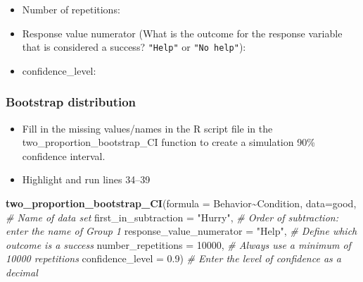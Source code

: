 \documentclass[
]{report}
\newenvironment{Shaded}{\begin{snugshade}}{\end{snugshade}}
\newcommand{\AttributeTok}[1]{\textcolor[rgb]{0.13,0.29,0.53}{#1}}
\newcommand{\CommentTok}[1]{\textcolor[rgb]{0.56,0.35,0.01}{\textit{#1}}}
\newcommand{\DecValTok}[1]{\textcolor[rgb]{0.00,0.00,0.81}{#1}}
\newcommand{\FloatTok}[1]{\textcolor[rgb]{0.00,0.00,0.81}{#1}}
\newcommand{\FunctionTok}[1]{\textcolor[rgb]{0.13,0.29,0.53}{\textbf{#1}}}
\newcommand{\NormalTok}[1]{#1}
\newcommand{\SpecialCharTok}[1]{\textcolor[rgb]{0.81,0.36,0.00}{\textbf{#1}}}
\newcommand{\StringTok}[1]{\textcolor[rgb]{0.31,0.60,0.02}{#1}}
\providecommand{\tightlist}{%
  \setlength{\itemsep}{0pt}\setlength{\parskip}{0pt}}
\begin{document}
\vspace{.15in}

\begin{itemize}
\tightlist
\item
  Number of repetitions:
\end{itemize}

\vspace{.15in}

\begin{itemize}
\tightlist
\item
  Response value numerator (What is the outcome for the response variable that is considered a success? \texttt{"Help"} or \texttt{"No\ help"}):
\end{itemize}

\vspace{.15in}

\begin{itemize}
\tightlist
\item
  confidence\_level:
\end{itemize}

\vspace{.15in}

\subsubsection*{Bootstrap distribution}\label{bootstrap-distribution-1}

\begin{itemize}
\item
  Fill in the missing values/names in the R script file in the two\_proportion\_bootstrap\_CI function to create a simulation 90\% confidence interval.
\item
  Highlight and run lines 34--39
\end{itemize}

\begin{Shaded}
\begin{Highlighting}[]
\FunctionTok{two\_proportion\_bootstrap\_CI}\NormalTok{(}\AttributeTok{formula =}\NormalTok{ Behavior}\SpecialCharTok{\textasciitilde{}}\NormalTok{Condition, }
         \AttributeTok{data=}\NormalTok{good, }\CommentTok{\# Name of data set}
         \AttributeTok{first\_in\_subtraction =} \StringTok{"Hurry"}\NormalTok{, }\CommentTok{\# Order of subtraction: enter the name of Group 1}
         \AttributeTok{response\_value\_numerator =} \StringTok{"Help"}\NormalTok{, }\CommentTok{\# Define which outcome is a success }
         \AttributeTok{number\_repetitions =} \DecValTok{10000}\NormalTok{, }\CommentTok{\# Always use a minimum of 10000 repetitions}
         \AttributeTok{confidence\_level =} \FloatTok{0.9}\NormalTok{) }\CommentTok{\# Enter the level of confidence as a decimal}
\end{Highlighting}
\end{Shaded}
\end{document}
